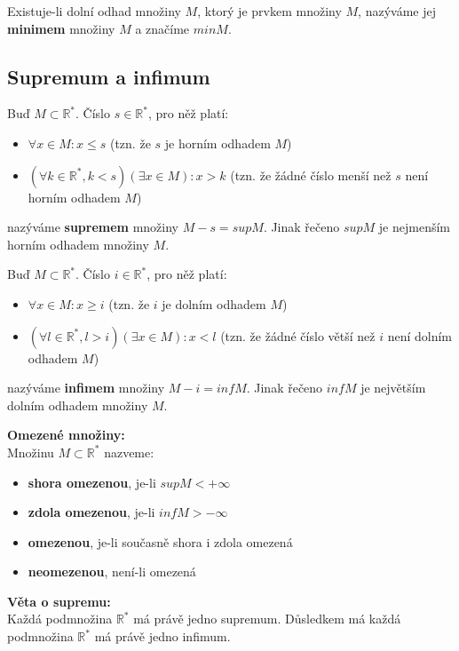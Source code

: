 \noindent Existuje-li dolní odhad množiny \( M \), ktorý je prvkem množiny \( M \), nazýváme jej \textbf{minimem} množiny \( M \) a značíme \( min M \).

\subsection{Supremum a infimum}
Buď \( M \subset \mathbb{R}^* \). Číslo \( s \in \mathbb{R}^* \), pro něž platí:
\begin{itemize}
    \item \( \forall x \in M : x \leq s\) (tzn. že \( s \) je horním odhadem \( M \))
    \item \( (\forall k \in \mathbb{R}^* , k < s)(\exists x \in M) : x > k \) (tzn. že žádné číslo menší než \( s \) není horním odhadem \( M \))
\end{itemize}
nazýváme \textbf{supremem} množiny \( M - s = sup M \). Jinak řečeno \( sup M \) je nejmenším horním odhadem množiny \( M \).

\bigskip

\noindent Buď \( M \subset \mathbb{R}^* \). Číslo \( i \in \mathbb{R}^* \), pro něž platí:
\begin{itemize}
    \item \( \forall x \in M : x \geq i\) (tzn. že \( i \) je dolním odhadem \( M \))
    \item \( (\forall l \in \mathbb{R}^* , l > i)(\exists x \in M) : x < l \) (tzn. že žádné číslo větší než \( i \) není dolním odhadem \( M \))
\end{itemize}
nazýváme \textbf{infimem} množiny \( M - i = inf M \). Jinak řečeno \( inf M \) je největším dolním odhadem množiny \( M \).

\bigskip

\noindent \textbf{Omezené množiny:} \\
Množinu \( M \subset \mathbb{R}^* \) nazveme:
\begin{itemize}
    \item \textbf{shora omezenou}, je-li \( sup M < +\infty \)
    \item \textbf{zdola omezenou}, je-li \( inf M > -\infty \)
    \item \textbf{omezenou}, je-li současně shora i zdola omezená
    \item \textbf{neomezenou}, není-li omezená 
\end{itemize}

\bigskip

\noindent \textbf{Věta o supremu:} \\
Každá podmnožina \( \mathbb{R}^* \) má právě jedno supremum. Důsledkem má každá podmnožina \( \mathbb{R}^* \) má právě jedno infimum.
